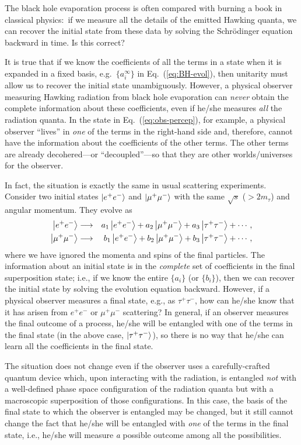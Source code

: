 \documentclass[12pt]{article}
\begin{document}
The black hole evaporation process is often compared with burning a book 
in classical physics:\ if we measure all the details of the emitted Hawking 
quanta, we can recover the initial state from these data by solving the 
Schr\"{o}dinger equation backward in time.  Is this correct?

It is true that if we know the coefficients of all the terms in a state 
when it is expanded in a fixed basis, e.g.\ $\{ a^\infty_i \}$ in 
Eq.~(\ref{eq:BH-evol}), then unitarity must allow us to recover the 
initial state unambiguously.  However, a physical observer measuring 
Hawking radiation from black hole evaporation can {\it never} obtain 
the complete information about these coefficients, even if he/she measures 
{\it all} the radiation quanta.  In the state in Eq.~(\ref{eq:obs-percep}), 
for example, a physical observer ``lives'' in {\it one} of the terms in 
the right-hand side and, therefore, cannot have the information about 
the coefficients of the other terms.  The other terms are already 
decohered---or ``decoupled''---so that they are other worlds/universes 
for the observer.

In fact, the situation is exactly the same in usual scattering experiments. 
Consider two initial states $\left| e^+e^- \right>$ and $\left| \mu^+\mu^- \right>$ with the 
same $\sqrt{s}$ ($> 2 m_\tau$) and angular momentum.  They evolve as
%
\begin{eqnarray}
  \left| e^+e^- \right> &\longrightarrow& a_1 \left| e^+e^- \right> + a_2 \left| \mu^+\mu^- \right> 
    + a_3 \left| \tau^+\tau^- \right> + \cdots,
\\
  \left| \mu^+\mu^- \right> &\longrightarrow& b_1 \left| e^+e^- \right> + b_2 \left| \mu^+\mu^- \right> 
    + b_3 \left| \tau^+\tau^- \right> + \cdots,
\end{eqnarray}
%
where we have ignored the momenta and spins of the final particles. 
The information about an initial state is in the {\it complete} set 
of coefficients in the final superposition state; i.e., if we know 
the entire $\{ a_i \}$ (or $\{ b_i \}$), then we can recover the initial 
state by solving the evolution equation backward.  However, if a physical 
observer measures a final state, e.g., as $\tau^+\tau^-$, how can he/she 
know that it has arisen from $e^+e^-$ or $\mu^+\mu^-$ scattering?  In 
general, if an observer measures the final outcome of a process, he/she 
will be entangled with one of the terms in the final state (in the above 
case, $\left| \tau^+\tau^- \right>$), so there is no way that he/she can learn 
all the coefficients in the final state.

The situation does not change even if the observer uses a carefully-crafted 
quantum device which, upon interacting with the radiation, is entangled 
{\it not} with a well-defined phase space configuration of the radiation 
quanta but with a macroscopic superposition of those configurations.  In 
this case, the basis of the final state to which the observer is entangled 
may be changed, but it still cannot change the fact that he/she will be 
entangled with {\it one} of the terms in the final state, i.e., he/she 
will measure {\it a} possible outcome among all the possibilities.
\end{document}
